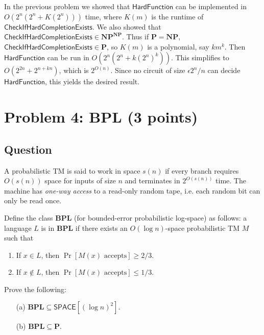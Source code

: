 \documentclass{article}
\renewcommand{\P}{\mathbf{P}}
\newcommand{\NP}{\mathbf{NP}}
\newcommand{\EXP}{\mathbf{EXP}}
\def \SPACE{{\mathsf{SPACE}}}
\def \BPL{{\mathbf{BPL}}}
\begin{document}




In the previous problem we showed that $\mathsf{HardFunction}$ can be implemented in $O(2^n(2^n + K(2^n)))$ time, where $K(m)$ is the runtime of $\mathsf{CheckIfHardCompletionExists}$.
We also showed that $\mathsf{CheckIfHardCompletionExists} \in \NP^\NP$.
Thus if $\P = \NP$, $\mathsf{CheckIfHardCompletionExists} \in \P$, so $K(m)$ is a polynomial, say $km^k$.
Then $\mathsf{HardFunction}$ can be run in $O(2^n(2^n + k(2^n)^k))$.
This simplifies to $O(2^{2n} + 2^{n + kn})$, which is $2^{O(n)}$.
Since no circuit of size $\epsilon 2^n/n$ can decide $\mathsf{HardFunction}$, this yields the desired result.


\newpage
\section*{Problem 4: BPL (3 points)}

\subsection*{Question}
A probabilistic TM is said to work in space $s(n)$ if every branch requires $O(s(n))$ space for inputs of size $n$ and terminates in $2^{O(s(n))}$ time. The machine has \emph{one-way access} to a read-only random tape, i.e. each random bit can only be read once.

Define the class $\BPL$ (for bounded-error probabilistic log-space) as follows: a language $L$ is in $\BPL$ if there exists an $O(\log n)$-space probabilistic TM $M$ such that 
\begin{enumerate}
    \item If $x\in L$, then $\Pr[M(x)\text{ accepts}]\ge 2/3$.
    \item If $x\not\in L$, then $\Pr[M(x)\text{ accepts}]\le 1/3$.
\end{enumerate}
Prove the following:
\begin{enumerate}
    \item[(a)] $\BPL\subseteq \SPACE[(\log n)^2]$.
    \item[(b)] $\BPL\subseteq \P$.
\end{enumerate}
\end{document}
